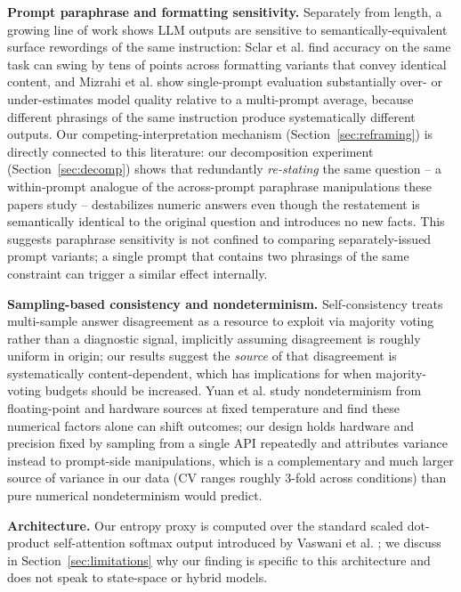\documentclass[11pt,letterpaper]{article}
\begin{document}
\textbf{Prompt paraphrase and formatting sensitivity.} Separately from length, a growing line of work shows LLM outputs are sensitive to semantically-equivalent surface rewordings of the same instruction: Sclar et al. \citep{Sclar2023} find accuracy on the same task can swing by tens of points across formatting variants that convey identical content, and Mizrahi et al. \citep{Mizrahi2023} show single-prompt evaluation substantially over- or under-estimates model quality relative to a multi-prompt average, because different phrasings of the same instruction produce systematically different outputs. Our competing-interpretation mechanism (Section~\ref{sec:reframing}) is directly connected to this literature: our decomposition experiment (Section~\ref{sec:decomp}) shows that redundantly \emph{re-stating} the same question -- a within-prompt analogue of the across-prompt paraphrase manipulations these papers study -- destabilizes numeric answers even though the restatement is semantically identical to the original question and introduces no new facts. This suggests paraphrase sensitivity is not confined to comparing separately-issued prompt variants; a single prompt that contains two phrasings of the same constraint can trigger a similar effect internally.

\textbf{Sampling-based consistency and nondeterminism.} Self-consistency \citep{Wang2022} treats multi-sample answer disagreement as a resource to exploit via majority voting rather than a diagnostic signal, implicitly assuming disagreement is roughly uniform in origin; our results suggest the \emph{source} of that disagreement is systematically content-dependent, which has implications for when majority-voting budgets should be increased. Yuan et al. \citep{Yuan2025} study nondeterminism from floating-point and hardware sources at fixed temperature and find these numerical factors alone can shift outcomes; our design holds hardware and precision fixed by sampling from a single API repeatedly and attributes variance instead to prompt-side manipulations, which is a complementary and much larger source of variance in our data (CV ranges roughly 3-fold across conditions) than pure numerical nondeterminism would predict.

\textbf{Architecture.} Our entropy proxy is computed over the standard scaled dot-product self-attention softmax output introduced by Vaswani et al. \citep{Vaswani2017}; we discuss in Section~\ref{sec:limitations} why our finding is specific to this architecture and does not speak to state-space or hybrid models.
\end{document}
